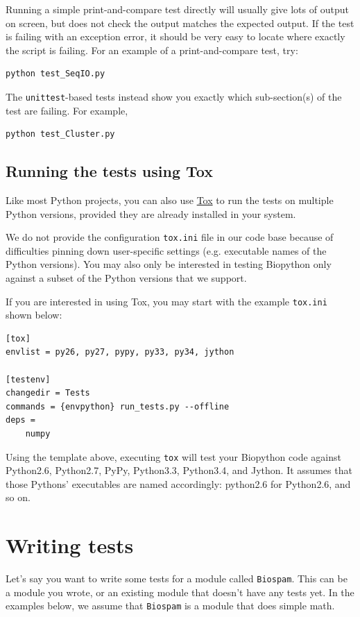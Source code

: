 \documentclass{report}
\begin{document}
Running a simple print-and-compare test directly will usually give lots
of output on screen, but does not check the output matches the expected
output.  If the test is failing with an exception error, it should be
very easy to locate where exactly the script is failing.
For an example of a print-and-compare test, try:
\begin{verbatim}
python test_SeqIO.py
\end{verbatim}

The \verb|unittest|-based tests instead show you exactly which sub-section(s) of
the test are failing. For example,
\begin{verbatim}
python test_Cluster.py
\end{verbatim}

\subsection{Running the tests using Tox}

Like most Python projects, you can also use
\href{http://tox.readthedocs.org/en/latest/}{Tox} to run the tests on multiple
Python versions, provided they are already installed in your system.

We do not provide the configuration \texttt{tox.ini} file in our code base because
of difficulties pinning down user-specific settings (e.g. executable names of the
Python versions). You may also only be interested in testing Biopython only against
a subset of the Python versions that we support.

If you are interested in using Tox, you may start with the example \texttt{tox.ini}
shown below:

\begin{verbatim}
[tox]
envlist = py26, py27, pypy, py33, py34, jython

[testenv]
changedir = Tests
commands = {envpython} run_tests.py --offline
deps =
    numpy
\end{verbatim}

Using the template above, executing \texttt{tox} will test your Biopython code against
Python2.6, Python2.7, PyPy, Python3.3, Python3.4, and Jython. It assumes that those
Pythons' executables are named accordingly: python2.6 for Python2.6, and so on.


\section{Writing tests}

Let's say you want to write some tests for a module called \verb|Biospam|.
This can be a module you wrote, or an existing module that doesn't have
any tests yet.  In the examples below, we assume that
\verb|Biospam| is a module that does simple math.
\end{document}

